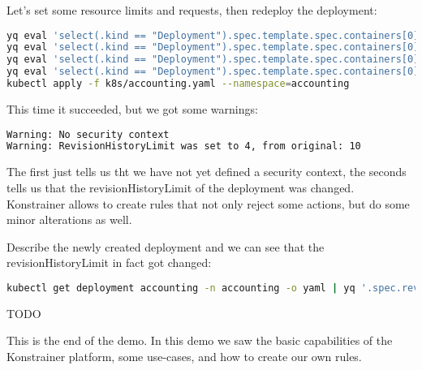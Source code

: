 Let's set some resource limits and requests, then redeploy the deployment:

\begin{lstlisting}[caption={TODO},language=bash,label=code:bashx]
yq eval 'select(.kind == "Deployment").spec.template.spec.containers[0].resources.limits.cpu = "500m"' k8s/accounting.yaml -i
yq eval 'select(.kind == "Deployment").spec.template.spec.containers[0].resources.limits.memory = "128Mi"' k8s/accounting.yaml -i
yq eval 'select(.kind == "Deployment").spec.template.spec.containers[0].resources.requests.cpu = "500m"' k8s/accounting.yaml -i
yq eval 'select(.kind == "Deployment").spec.template.spec.containers[0].resources.requests.memory = "128Mi"' k8s/accounting.yaml -i
kubectl apply -f k8s/accounting.yaml --namespace=accounting
\end{lstlisting}

This time it succeeded, but we got some warnings:

\begin{lstlisting}[caption={TODO},language=bash,label=code:todo]
Warning: No security context
Warning: RevisionHistoryLimit was set to 4, from original: 10
\end{lstlisting}

The first just tells us tht we have not yet defined a security context, the seconds tells us that the revisionHistoryLimit of the deployment was changed. Konstrainer allows to create rules that not only reject some actions, but do some minor alterations as well.

Describe the newly created deployment and we can see that the revisionHistoryLimit in fact got changed:

\begin{lstlisting}[caption={TODO},language=bash,label=code:bashx]
kubectl get deployment accounting -n accounting -o yaml | yq '.spec.revisionHistoryLimit'
\end{lstlisting}


TODO

This is the end of the demo. In this demo we saw the basic capabilities of the Konstrainer platform, some use-cases, and how to create our own rules.
